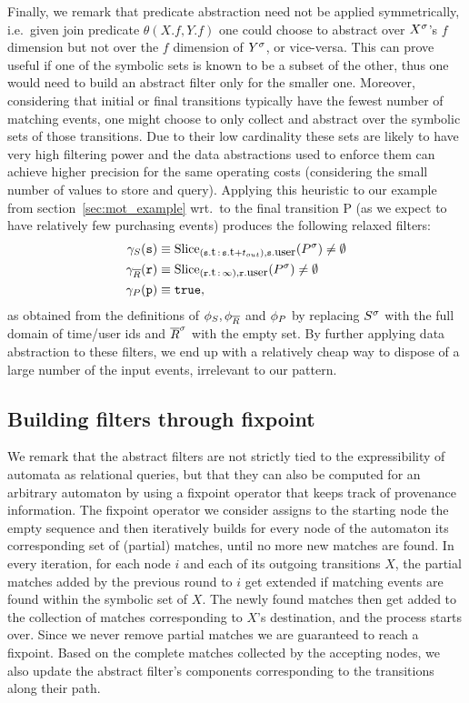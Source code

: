 Finally, we remark that predicate abstraction need not be applied symmetrically,
i.e.\ given join predicate $\theta(X.f, Y.f)$ one could choose to abstract over 
${X}^{\sigma}$'s $f$ dimension but not over the $f$ dimension of ${Y}^{\sigma}$, or 
vice-versa.  
This can prove useful if one of the symbolic sets is known to be a subset of 
the other, thus one would need to build an abstract filter only for the smaller 
one. 
Moreover, considering that initial or final transitions typically have the 
fewest number of matching events, one might choose to only collect and abstract 
over the symbolic sets of those transitions.
Due to their low cardinality these sets are likely to have very high 
filtering power and the data abstractions used to enforce them can achieve 
higher precision for the same operating costs (considering the small number of 
values to store and query).
Applying this heuristic to our example from section~\ref{sec:mot_example} wrt.\ 
to the final transition P (as we expect to have relatively few purchasing 
events) produces the following relaxed filters:
\begin{align*}
\heurs{S}(\symv{s}) 
&\equiv  
\slice{\syms{P}}
{(\facc{\symv{s}}{t}\,:\,\facc{\symv{s}}{t} + t_{out}),
	\facc{\symv{s}}{user}} 
\neq \emptyset
\\
\heurs{\oR}(\symv{r}) 
&\equiv
\slice{\syms{P}}{(\facc{\symv{r}}{t}\,:\,\infty), \facc{\symv{r}}{user}}
\neq \emptyset
\\
\heurs{P}(\symv{p}) 
&\equiv \texttt{true},
\end{align*}
as obtained 
from the definitions of $\phi_{S}, \phi_{\overline{R}}$ and $\phi_{P}$
by replacing ${S}^{\sigma}$ with the full domain of time/user ids and  
${\overline{R}}^{\sigma}$ with the empty set. 
By further applying data abstraction to these filters, we end up with a 
relatively cheap way to dispose of a large number of the input events, 
irrelevant to our pattern.  

\subsection{Building filters through fixpoint}


We remark that the abstract filters are not strictly tied to the  
expressibility of automata as relational queries, but that they can also be 
computed for an arbitrary automaton by using a fixpoint operator that keeps 
track of provenance information.
The fixpoint operator we consider assigns to the starting node the empty 
sequence and then iteratively builds for every node of the automaton its 
corresponding set of (partial) matches, until no more new matches are found. 
In every iteration, for each node $i$ and each of its outgoing transitions $X$, 
the partial matches added by the previous round to $i$ get extended if matching 
events are found within the symbolic set of $X$. 
The newly found matches then get added to the collection of matches 
corresponding to $X$'s destination, and the process starts over.  
Since we never remove partial matches we are guaranteed to reach a fixpoint.
Based on the complete matches collected by the accepting nodes, we also update 
the abstract filter's components corresponding to the transitions along their 
path.

